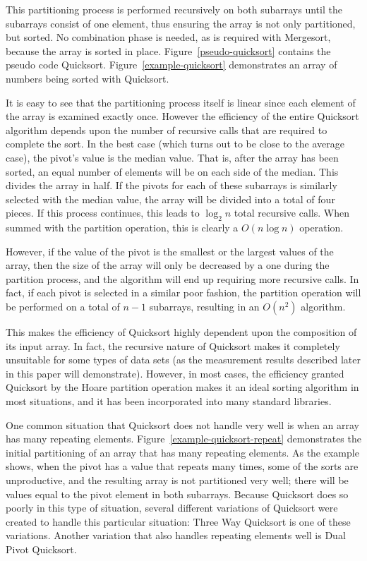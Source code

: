 \documentclass{article}
\begin{document}
This partitioning process is performed recursively on both subarrays until the subarrays consist
of one element, thus ensuring the array is not only partitioned, but sorted. No combination phase is 
needed, as is required with Mergesort, because the array is sorted in place. 
Figure~\ref{pseudo-quicksort} contains the pseudo code Quicksort. 
Figure~\ref{example-quicksort} demonstrates an array of numbers being sorted with Quicksort.

It is easy to see that the partitioning process itself is linear since each element of the array
is examined exactly once. However the efficiency of the entire Quicksort algorithm depends
upon the number of recursive calls that are required to complete the sort. In the best case
(which turns out to be close to the average case), the pivot's value is the median value. That is, 
after the array has been sorted, an equal number of elements will be on each side of the median. 
This divides the array in half. If the pivots for each of these subarrays is similarly selected with the
median value, the array will be divided into a total of four pieces. If this process continues,
this leads to $\log_2n$ total recursive calls. When summed with the partition operation, this is
clearly a $O(n \log n)$ operation.

However, if the value of the pivot is the smallest or the largest values of the array, 
then the size of the array will only be decreased by a one during the partition process, and the 
algorithm will end up requiring more recursive calls. In fact, if each pivot
is selected in a similar poor fashion, the partition operation will be performed on a total of $n-1$ 
subarrays, resulting in an $O(n^2)$ algorithm.

This makes the efficiency of Quicksort highly dependent upon the composition of its input
array. In fact, the recursive nature of Quicksort makes it completely unsuitable for some types
of data sets (as the measurement results described later in this paper will demonstrate). 
However, in most cases, the efficiency granted Quicksort by the Hoare partition operation makes
it an ideal sorting algorithm in most situations, and it has been incorporated into many standard
libraries.

One common situation that Quicksort does not handle very well is when an array has many 
repeating elements. Figure~\ref{example-quicksort-repeat} demonstrates the initial partitioning
of an array that has many repeating elements. As the example shows, when the pivot has a value
that repeats many times, some of the sorts are unproductive, and the resulting array is
not partitioned very well; there will be values equal to the pivot element in both subarrays.
Because Quicksort does so poorly in this type of situation, several different variations of Quicksort
were created to handle this particular situation: Three Way Quicksort
is one of these variations. Another variation that also handles repeating
elements well is Dual Pivot Quicksort.
\end{document}
